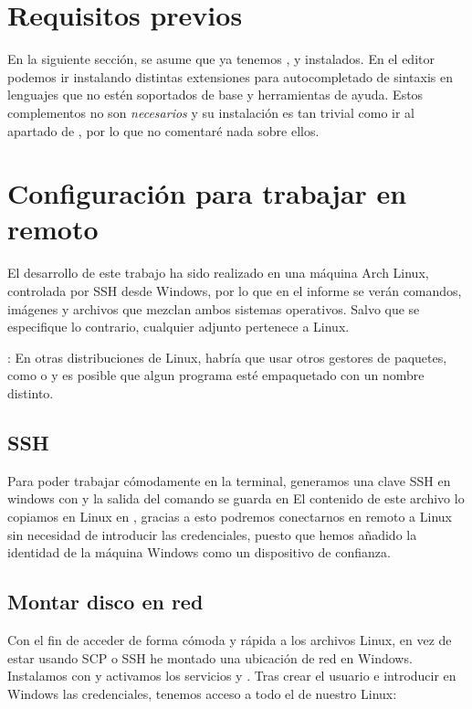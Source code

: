 \section{Requisitos previos}
En la siguiente sección, se asume que ya tenemos ,  y  instalados. En el editor podemos ir instalando distintas extensiones para autocompletado de sintaxis en lenguajes que no estén soportados de base y herramientas de ayuda. Estos complementos no son \textit{necesarios} y su instalación es tan trivial como ir al apartado de , por lo que no comentaré nada sobre ellos.

\section{Configuración para trabajar en remoto}
El desarrollo de este trabajo ha sido realizado en una máquina Arch Linux, controlada por SSH desde Windows, por lo que en el informe se verán comandos, imágenes y archivos que mezclan ambos sistemas operativos. Salvo que se especifique lo contrario, cualquier adjunto pertenece a Linux. \par
{}: En otras distribuciones de Linux, habría que usar otros gestores de paquetes, como  o  y es posible que algun programa esté empaquetado con un nombre distinto.

  \subsection{SSH}
  Para poder trabajar cómodamente en la terminal, generamos una clave SSH en windows con  y la salida del comando se guarda en  \newline
  El contenido de este archivo lo copiamos en Linux en , gracias a esto podremos conectarnos en remoto a Linux sin necesidad de introducir las credenciales, puesto que hemos añadido la identidad de la máquina Windows como un dispositivo de confianza.

  \subsection{Montar disco en red}
  Con el fin de acceder de forma cómoda y rápida a los archivos Linux, en vez de estar usando SCP o SSH he montado una ubicación de red en Windows. Instalamos con  y activamos los servicios  y . Tras crear el usuario e introducir en Windows las credenciales, tenemos acceso a todo el  de nuestro Linux:

